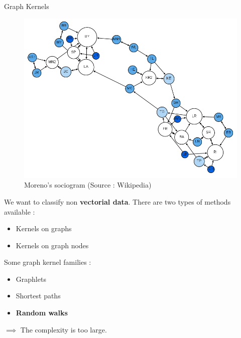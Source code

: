 \documentclass[compress]{beamer}
\begin{document}
\begin{frame}{Graph Kernels}
	\RLmulticolcolumns
	\begin{multicols}{2}
		\vspace*{\fill}
		\begin{figure}
			\includegraphics[width=0.7\linewidth]{data/sociogram.png}
			\caption*{\footnotesize Moreno's sociogram (Source : Wikipedia)}
		\end{figure}
		\vfill\null
		\columnbreak
		{We want to classify non \textbf{vectorial data}. There are two types of methods available :
			\begin{itemize}
				\item Kernels on graphs
				\item Kernels on graph nodes
			\end{itemize}
		\pause
		Some graph kernel families :
		\begin{itemize}
			\item Graphlets \citep{shervashidze_efficient_2009}
			\pause
			\item Shortest paths \citep{borgwardt2005shortest}
			\pause
			\item \textbf{Random walks} \citep{vishwanathan_graph_2010}
		\end{itemize}
		$\implies$ The complexity is too large.
		}
	\end{multicols}
\end{frame}
\end{document}
